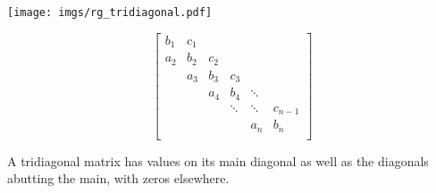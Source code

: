 \begin{center}
\texttt{[image: imgs/rg\_tridiagonal.pdf]}
\end{center}

\begin{equation}
\begin{bmatrix}
b_1 & c_1 &     &        &        &         \\
a_2 & b_2 & c_2 &        &        &         \\
    & a_3 & b_3 & c_3    &        &         \\
    &     & a_4 & b_4    & \ddots &         \\
    &     &     & \ddots & \ddots & c_{n-1} \\
    &     &     &        & a_n    & b_n     \\
\end{bmatrix}
\end{equation}

A tridiagonal matrix has values on its main diagonal as well as the diagonals abutting the main, with zeros elsewhere.

